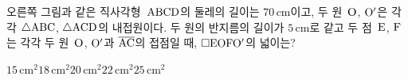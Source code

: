 \noindent\begin{minipage}[t]{0.58\linewidth}\vspace{0pt}\raggedright 오른쪽 그림과 같은 직사각형~$\mathrm{ABCD}$의 둘레의 길이는 $70\,\mathrm{cm}$이고, 두 원~$\mathrm{O}$, $\mathrm{O'}$은 각각 $\triangle\mathrm{ABC}$, $\triangle\mathrm{ACD}$의 내접원이다. 두 원의 반지름의 길이가 $5\,\mathrm{cm}$로 같고 두 점~$\mathrm{E}$, $\mathrm{F}$는 각각 두 원~$\mathrm{O}$, $\mathrm{O'}$과 $\overline{\mathrm{AC}}$의 접점일 때, $\square\mathrm{EOFO'}$의 넓이는?\end{minipage}\hfill\begin{minipage}[t]{0.4\linewidth}\vspace{0pt}\centering \resizebox{\ifdim\width>\linewidth\linewidth\else\width\fi}{!}{}\end{minipage}\par
\begin{choices32}{$15\,\mathrm{cm}^2$}{$18\,\mathrm{cm}^2$}{$20\,\mathrm{cm}^2$}{$22\,\mathrm{cm}^2$}{$25\,\mathrm{cm}^2$}\end{choices32}
